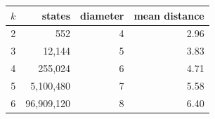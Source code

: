 \begin{tabular}{rrrr}
\toprule
$k$ & states & diameter & mean distance \\
\midrule
2 & 552 & 4 & 2.96 \\
3 & 12{,}144 & 5 & 3.83 \\
4 & 255{,}024 & 6 & 4.71 \\
5 & 5{,}100{,}480 & 7 & 5.58 \\
6 & 96{,}909{,}120 & 8 & 6.40 \\
\bottomrule
\end{tabular}